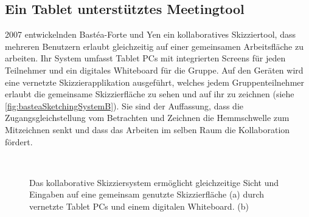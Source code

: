 \subsection{Ein Tablet unterstütztes Meetingtool}
2007 entwickelnden Bastéa-Forte und Yen ein kollaboratives Skizziertool, dass mehreren Benutzern erlaubt gleichzeitig auf einer gemeinsamen Arbeitsfläche zu arbeiten. Ihr System umfasst Tablet PCs mit integrierten Screens für jeden Teilnehmer und ein digitales Whiteboard für die Gruppe. Auf den Geräten wird eine vernetzte Skizzierapplikation ausgeführt, welches jedem Gruppenteilnehmer erlaubt die gemeinsame Skizzierfläche zu sehen und auf ihr zu zeichnen (siehe \autoref{fig:basteaSketchingSystemB}). Sie sind der Auffassung, dass die Zugangsgleichstellung vom Betrachten und Zeichnen die Hemmschwelle zum Mitzeichnen senkt und dass das Arbeiten im selben Raum die Kollaboration fördert. 

\begin{figure}
        \myfloatalign
         \quad
         \\
        \caption[Das kollaborative Skizziersystem.]{Das kollaborative Skizziersystem ermöglicht gleichzeitige Sicht und Eingaben auf eine gemeinsam genutzte Skizzierfläche (a) durch vernetzte Tablet PCs und einem digitalen Whiteboard. (b) }\label{fig:basteaSketchingSystemB}
\end{figure}

